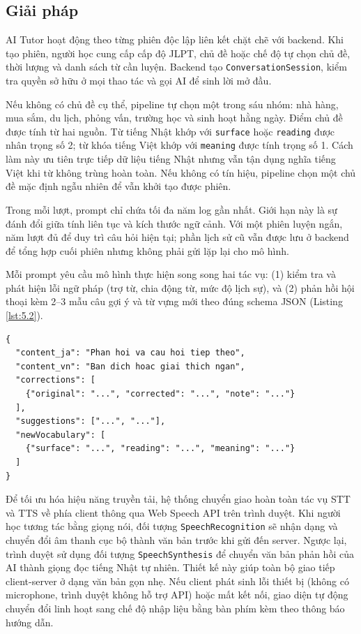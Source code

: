\documentclass[../DoAn.tex]{subfiles}
\begin{document}
\subsection{Giải pháp}
\label{subsection:5.4.2}

AI Tutor hoạt động theo từng phiên độc lập liên kết chặt chẽ với backend. Khi tạo phiên, người học cung cấp cấp độ JLPT, chủ đề hoặc chế độ tự chọn chủ đề, thời lượng và danh sách từ cần luyện. Backend tạo \texttt{ConversationSession}, kiểm tra quyền sở hữu ở mọi thao tác và gọi AI để sinh lời mở đầu.

Nếu không có chủ đề cụ thể, pipeline tự chọn một trong sáu nhóm: nhà hàng, mua sắm, du lịch, phỏng vấn, trường học và sinh hoạt hằng ngày. Điểm chủ đề được tính từ hai nguồn. Từ tiếng Nhật khớp với \texttt{surface} hoặc \texttt{reading} được nhân trọng số 2; từ khóa tiếng Việt khớp với \texttt{meaning} được tính trọng số 1. Cách làm này ưu tiên trực tiếp dữ liệu tiếng Nhật nhưng vẫn tận dụng nghĩa tiếng Việt khi từ không trùng hoàn toàn. Nếu không có tín hiệu, pipeline chọn một chủ đề mặc định ngẫu nhiên để vẫn khởi tạo được phiên.

Trong mỗi lượt, prompt chỉ chứa tối đa năm log gần nhất. Giới hạn này là sự đánh đổi giữa tính liên tục và kích thước ngữ cảnh. Với một phiên luyện ngắn, năm lượt đủ để duy trì câu hỏi hiện tại; phần lịch sử cũ vẫn được lưu ở backend để tổng hợp cuối phiên nhưng không phải gửi lặp lại cho mô hình.

Mỗi prompt yêu cầu mô hình thực hiện song song hai tác vụ: (1) kiểm tra và phát hiện lỗi ngữ pháp (trợ từ, chia động từ, mức độ lịch sự), và (2) phản hồi hội thoại kèm 2--3 mẫu câu gợi ý và từ vựng mới theo đúng schema JSON (Listing \ref{lst:5.2}).

\begin{lstlisting}[caption={Schema phản hồi của AI Tutor}, label={lst:5.2}, captionpos=b]
{
  "content_ja": "Phan hoi va cau hoi tiep theo",
  "content_vn": "Ban dich hoac giai thich ngan",
  "corrections": [
    {"original": "...", "corrected": "...", "note": "..."}
  ],
  "suggestions": ["...", "..."],
  "newVocabulary": [
    {"surface": "...", "reading": "...", "meaning": "..."}
  ]
}
\end{lstlisting}

Để tối ưu hóa hiệu năng truyền tải, hệ thống chuyển giao hoàn toàn tác vụ STT và TTS về phía client thông qua Web Speech API trên trình duyệt. Khi người học tương tác bằng giọng nói, đối tượng \texttt{SpeechRecognition} sẽ nhận dạng và chuyển đổi âm thanh cục bộ thành văn bản trước khi gửi đến server. Ngược lại, trình duyệt sử dụng đối tượng \texttt{SpeechSynthesis} để chuyển văn bản phản hồi của AI thành giọng đọc tiếng Nhật tự nhiên. Thiết kế này giúp toàn bộ giao tiếp client-server ở dạng văn bản gọn nhẹ. Nếu client phát sinh lỗi thiết bị (không có microphone, trình duyệt không hỗ trợ API) hoặc mất kết nối, giao diện tự động chuyển đổi linh hoạt sang chế độ nhập liệu bằng bàn phím kèm theo thông báo hướng dẫn.
\end{document}

